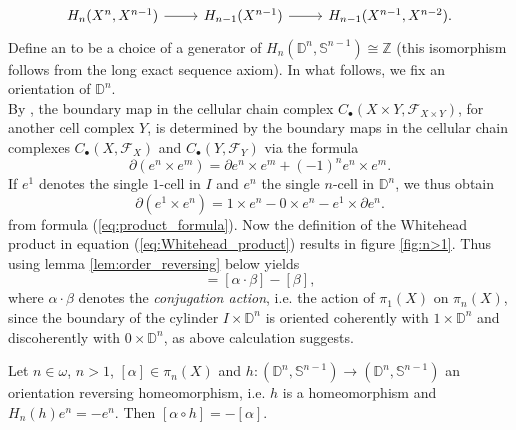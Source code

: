 \begin{equation*}
	\begin{tikzcd}
		H_n(X^n,X^{n - 1}) \arrow[r] & H_{n - 1}(X^{n - 1}) \arrow[r] & H_{n - 1}(X^{n - 1},X^{n - 2}).
	\end{tikzcd}
\end{equation*}
Define an  to be a choice of a generator of $H_n(\mathbb{D}^n,\mathbb{S}^{n - 1}) \cong \mathbb{Z}$ (this isomorphism follows from the long exact sequence axiom). In what follows, we fix an orientation of $\mathbb{D}^n$.\\
By \cite[269]{hatcher:algebraic_topology:2001}, the boundary map in the cellular chain complex $C_\bullet(X \times Y, \mathcal{F}_{X \times Y})$, for another cell complex $Y$, is determined by the boundary maps in the cellular chain complexes $C_\bullet(X,\mathcal{F}_X)$ and $C_\bullet(Y,\mathcal{F}_Y)$ via the formula
\begin{equation}
	\label{eq:product_formula}
	\partial(e^n \times e^m) = \partial e^n \times e^m + (-1)^ne^n \times e^m.
\end{equation}
If $e^1$ denotes the single $1$-cell in $I$ and $e^n$ the single $n$-cell in $\mathbb{D}^n$, we thus obtain
\begin{equation*}
	\partial(e^1 \times e^n) = 1 \times e^n - 0 \times e^n - e^1 \times \partial e^n.
\end{equation*}
\noindent from formula (\ref{eq:product_formula}). Now the definition of the Whitehead product in equation (\ref{eq:Whitehead_product}) results in figure \ref{fig:n>1}. Thus using lemma \ref{lem:order_reversing} below yields
\begin{equation*}
	[\alpha,\beta] = [\alpha \cdot \beta] - [\beta],
\end{equation*}
\noindent where $\alpha \cdot \beta$ denotes the \emph{conjugation action}, i.e. the action of $\pi_1(X)$ on $\pi_n(X)$, since the boundary of the cylinder $I \times \mathbb{D}^n$ is oriented coherently with $1 \times \mathbb{D}^n$ and discoherently with $0 \times \mathbb{D}^n$, as above calculation suggests.
\begin{lemma}
	\label{lem:order_reversing}
	Let $n \in \omega$, $n > 1$, $[\alpha] \in \pi_n(X)$ and $h : (\mathbb{D}^n,\mathbb{S}^{n - 1}) \to (\mathbb{D}^n,\mathbb{S}^{n - 1})$ an orientation reversing homeomorphism, i.e. $h$ is a homeomorphism and $H_n(h)e^n = - e^n$. Then $[\alpha \circ h] = -[\alpha]$.
\end{lemma}

